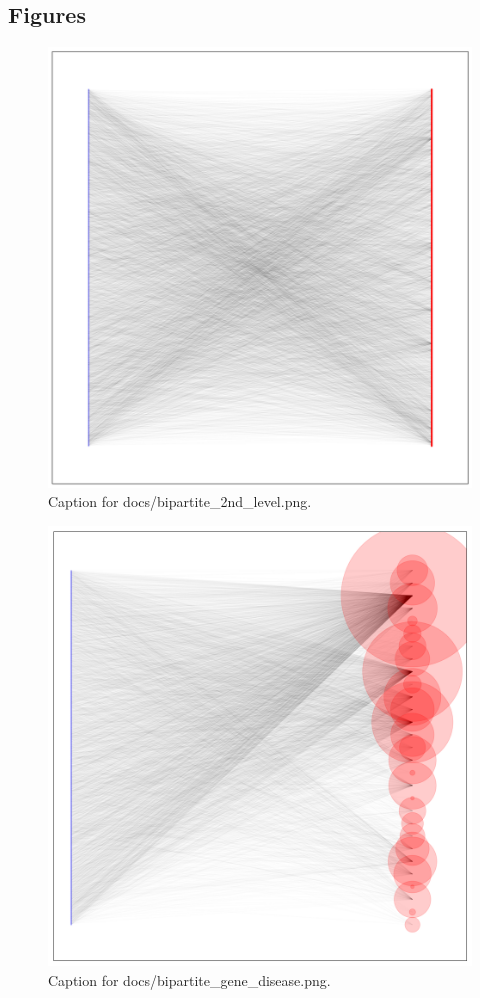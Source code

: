 \documentclass{article}
\begin{document}
\subsection{Figures}
\begin{figure}[h] \centering \includegraphics{docs/bipartite_2nd_level.png} \caption{Caption for docs/bipartite_2nd_level.png.} \end{figure}
\begin{figure}[h] \centering \includegraphics{docs/bipartite_gene_disease.png} \caption{Caption for docs/bipartite_gene_disease.png.} \end{figure}
\end{document}
